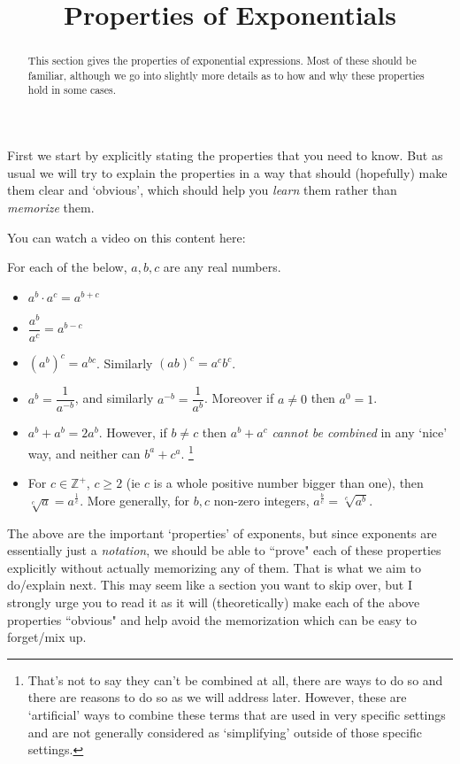 \documentclass{ximera}
\title{Properties of Exponentials}
\begin{document}
\begin{abstract}
    This section gives the properties of exponential expressions. Most of these should be familiar, although we go into slightly more details as to how and why these properties hold in some cases.
\end{abstract}
\maketitle


First we start by explicitly stating the properties that you need to know. But as usual we will try to explain the properties in a way that should (hopefully) make them clear and `obvious', which should help you \textit{learn} them rather than \textit{memorize} them. 

You can watch a video on this content here:



For each of the below, $a,b,c$ are any real numbers.



\begin{itemize}
    \item $a^b \cdot a^c = a^{b+c}$
    \item $\dfrac{a^b}{a^c} = a^{b-c}$
    \item $\left(a^b\right)^c = a^{bc}$. Similarly $(ab)^c = a^cb^c$.
    \item $a^b = \dfrac{1}{a^{-b}}$, and similarly $a^{-b} = \dfrac{1}{a^b}$. Moreover if $a \neq 0$ then $a^0 = 1$.
    \item $a^b + a^b = 2a^b$. However, if $b \neq c$ then $a^b + a^c$ \textit{cannot be combined} in any `nice' way, and neither can $b^a + c^a$.%
    \footnote{%
        That's not to say they can't be combined at all, there are ways to do so and there are reasons to do so as we will address later. However, these are `artificial' ways to combine these terms that are used in very specific settings and are not generally considered as `simplifying' outside of those specific settings.
        }
    \item For $c \in \mathbb{Z}^+$, $c \geq 2$ (ie $c$ is a whole positive number bigger than one), then $\sqrt[c]{a} = a^{\frac{1}{c}}$. More generally, for $b,c$ non-zero integers, $a^{\frac{b}{c}} = \sqrt[c]{a^b}$.
\end{itemize}

The above are the important `properties' of exponents, but since exponents are essentially just a \textit{notation}, we should be able to ``prove" each of these properties explicitly without actually memorizing any of them. That is what we aim to do/explain next. This may seem like a section you want to skip over, but I strongly urge you to read it as it will (theoretically) make each of the above properties ``obvious" and help avoid the memorization which can be easy to forget/mix up.
\end{document}
